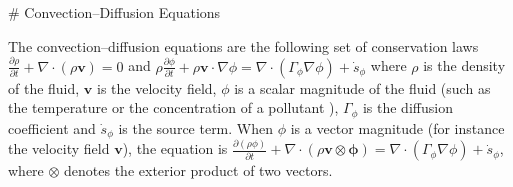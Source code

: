 # Convection--Diffusion Equations

The convection--diffusion equations are the following set of conservation laws $\frac{\partial \rho}{\partial t} + \nabla \cdot (\rho \mathbf{v}) = 0$ and $\rho \frac{\partial \phi}{\partial t} + \rho \mathbf{v} \cdot \nabla \phi = \nabla \cdot \left( 
\Gamma_\phi \nabla \phi \right) + \dot{s}_\phi$ where $\rho$ is the density of the fluid, $\mathbf{v}$ is the velocity field, $\phi$ is a scalar magnitude of the fluid (such as the temperature or the concentration of a pollutant ), $\Gamma_\phi$ is the diffusion 
coefficient and $\dot{s}_\phi$ is the source term. When $\phi$ is a vector magnitude (for instance the velocity field $\mathbf{v}$), the equation is $\frac{\partial(\rho \phi)}{\partial t} + \nabla \cdot (\rho \mathbf{v} \otimes \mathbf{\phi}) = \nabla \cdot 
\left( \Gamma_\phi \nabla \phi \right) + \dot{s}_\phi$, where $\otimes$ denotes the exterior product of two vectors.

